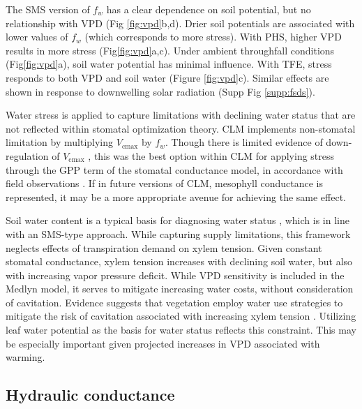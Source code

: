 \documentclass[draft,linenumbers]{agujournal}
\begin{document}
The SMS version of $f_w$ has a clear dependence on soil potential, but no relationship with VPD (Fig \ref{fig:vpd}b,d). 
Drier soil potentials are associated with lower values of $f_w$ (which corresponds to more stress).
With PHS, higher VPD results in more stress (Fig\ref{fig:vpd}a,c).
Under ambient throughfall conditions (Fig\ref{fig:vpd}a), soil water potential has minimal influence.
With TFE, stress responds to both VPD and soil water (Figure \ref{fig:vpd}c).
Similar effects are shown in response to downwelling solar radiation (Supp Fig \ref{supp:fsds}).

Water stress is applied to capture limitations with declining water status that are not reflected within stomatal optimization theory.
CLM implements non-stomatal limitation by multiplying $V_{\text{cmax}}$ by $f_w$.
Though there is limited evidence of down-regulation of $V_{\text{cmax}}$ \citep{flexas2006}, this was the best option within CLM 
for applying stress through the GPP term of the stomatal conductance model, in accordance with field observations \citep{lin2018,zhou2013}.
If in future versions of CLM, mesophyll conductance is represented, it may be a more appropriate avenue for achieving the same effect.

Soil water content is a typical basis for diagnosing water status \citep{drake2017}, which is in line with an SMS-type approach.
While capturing supply limitations, this framework neglects effects of transpiration demand on xylem tension.
Given constant stomatal conductance, xylem tension increases with declining soil water, but also with increasing vapor pressure deficit.
While VPD sensitivity is included in the Medlyn model, it serves to mitigate increasing water costs, without consideration of cavitation.
Evidence suggests that vegetation employ water use strategies to mitigate the risk of cavitation associated with increasing xylem tension \citep{sperry1998,fisher2006,choat2012}.
Utilizing leaf water potential as the basis for water status reflects this constraint.
This may be especially important given projected increases in VPD associated with warming.

\subsection{Hydraulic conductance}
\end{document}
